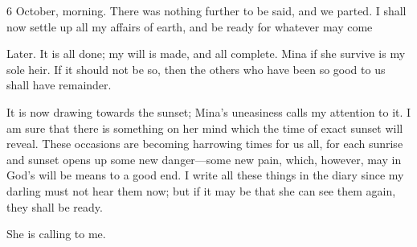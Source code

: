 \begin{diary}{6 October, morning.}
There was nothing further to be said, and we parted. I shall now settle up all my affairs of earth, and be ready for whatever may come
\end{diary}
 

\begin{diary}{Later.}
It is all done; my will is made, and all complete. Mina if she survive is my sole heir. If it should not be so, then the others who have been so good to us shall have remainder.

It is now drawing towards the sunset; Mina's uneasiness calls my attention to it. I am sure that there is something on her mind which the time of exact sunset will reveal. These occasions are becoming harrowing times for us all, for each sunrise and sunset opens up some new danger—some new pain, which, however, may in God's will be means to a good end. I write all these things in the diary since my darling must not hear them now; but if it may be that she can see them again, they shall be ready.

She is calling to me.

\end{diary}
